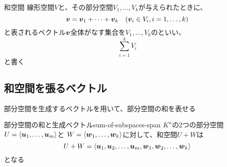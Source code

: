\documentclass[../../../topic_linear-algebra]{subfiles}
\begin{document}
\begin{definition}{和空間}
  線形空間$V$と、その部分空間$V_1,\ldots,V_k$が与えられたときに、
  \begin{equation*}
    \vb*{v} = \vb*{v}_1 + \cdots + \vb*{v}_k \quad (\vb*{v}_i \in V_i, i = 1, \ldots, k)
  \end{equation*}
  と表されるベクトル$\vb*{v}$全体がなす集合を$V_1,\ldots,V_k$のといい、
  \begin{equation*}
    \sum_{i=1}^k V_i
  \end{equation*}
  と書く
\end{definition}

\subsection{和空間を張るベクトル}

部分空間を生成するベクトルを用いて、部分空間の和を表せる

\begin{theorem}{部分空間の和と生成ベクトル}{sum-of-subspaces-span}
  $K^n$の2つの部分空間$U = \langle \vb*{u}_1, \dots, \vb*{u}_m \rangle$と
  $W = \langle \vb*{w}_1, \dots, \vb*{w}_k \rangle$に対して、和空間$U + W$は
  \begin{equation*}
    U + W = \langle \vb*{u}_1, \vb*{u}_2, \dots, \vb*{u}_m, \vb*{w}_1, \vb*{w}_2, \dots, \vb*{w}_k \rangle
  \end{equation*}
  となる
\end{theorem}
\end{document}
